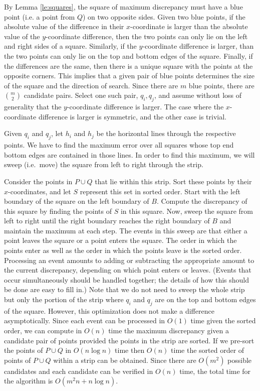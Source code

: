 \documentclass{elsart}
\begin{document}
 By Lemma \ref{le:squares},
 the square of maximum discrepancy must have
 a blue point (i.e. a point from $Q$) on two opposite sides. Given two
 blue points, if the absolute value of the difference in their
 $x$-coordinate is larger than the absolute value of the $y$-coordinate
 difference, then the two points can only lie on the left and right
 sides of a square. Similarly, if the $y$-coordinate difference is
 larger, than the two points can only lie on the top and bottom edges
 of the square. Finally, if the differences are the same, then there
 is a unique square with the points at the opposite
 corners. This implies that a given pair of blue points determines the
 size of the square and the direction of search. Since there are $m$
 blue points, there are $m \choose 2$ candidate pairs. Select one such
 pair, $q_i, q_j$, and assume without loss of generality that the
 $y$-coordinate difference is larger. The case where the $x$-coordinate
 difference is larger is symmetric, and the other case is trivial.


 Given $q_i$ and $q_j$, let $h_i$ and $h_j$ be the horizontal lines
 through the respective points.
 We have to find the maximum error over all squares whose top
 end bottom edges are contained in those lines.
 In order to find this maximum, we
 will sweep (i.e.~move) the square from left to right through the strip.

 Consider the points in $P\cup Q$ that lie within this strip. Sort
 these points by their $x$-coordinates, and let $S$ represent this set
 in sorted order. Start with the left boundary of the square on the
 left boundary of $B$. Compute the discrepancy of this square by
 finding the points of $S$ in this square. Now, sweep the square from
 left to right until the right boundary reaches the right boundary of
 $B$ and maintain the maximum at each step. The events in this sweep
 are that either a point leaves the square or a point enters the
 square. The order in which the points enter as well as the order in
 which the points leave is the sorted order. Processing an event
 amounts to adding or subtracting the appropriate amount to the current
 discrepancy, depending on which point enters or leaves. (Events that
 occur simultaneously should be handled together; the details of how
 this should be done are easy to fill in.)
 Note that we
 do not need to sweep the whole strip but only the portion of the strip
 where $q_i$ and $q_j$ are on the top and bottom edges of the
 square. However, this optimization does not make a difference
 asymptotically.  Since each event can be processed in $O(1)$ time
 given the sorted order, we can compute in $O(n)$ time the maximum
 discrepancy given a candidate pair of points provided the points in
 the strip are sorted. If we pre-sort the points of $P \cup Q$ in $O(n
 \log n)$ time then $O(n)$ time the sorted order of points of $P \cup
 Q$ within a strip can be obtained. Since there are $O(m^2)$ possible
 candidates and each candidate can be verified in $O(n)$ time, the
 total time for the algorithm is $O(m^2n + n\log n)$.
\end{document}
